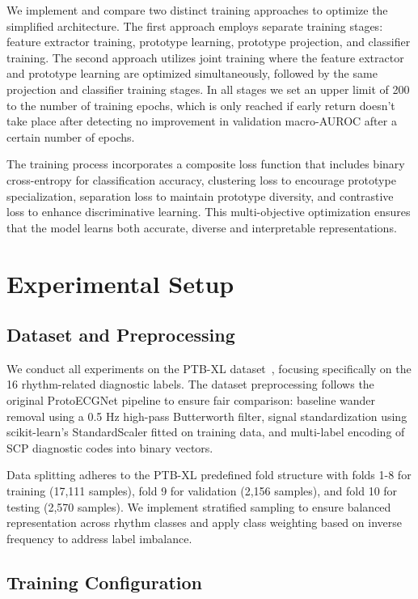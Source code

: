 We implement and compare two distinct training approaches to optimize the simplified architecture. The first approach employs separate training stages: feature extractor training, prototype learning, prototype projection, and classifier training. The second approach utilizes joint training where the feature extractor and prototype learning are optimized simultaneously, followed by the same projection and classifier training stages. In all stages we set an upper limit of 200 to the number of training epochs, which is only reached if early return doesn't take place after detecting no improvement in validation macro-AUROC after a certain number of epochs.

The training process incorporates a composite loss function that includes binary cross-entropy for classification accuracy, clustering loss to encourage prototype specialization, separation loss to maintain prototype diversity, and contrastive loss to enhance discriminative learning. This multi-objective optimization ensures that the model learns both accurate, diverse and interpretable representations.

\section{Experimental Setup}

\subsection{Dataset and Preprocessing}

We conduct all experiments on the PTB-XL dataset~\cite{wagner2020ptbxl}, focusing specifically on the 16 rhythm-related diagnostic labels. The dataset preprocessing follows the original ProtoECGNet pipeline to ensure fair comparison: baseline wander removal using a 0.5 Hz high-pass Butterworth filter, signal standardization using scikit-learn's StandardScaler fitted on training data, and multi-label encoding of SCP diagnostic codes into binary vectors.

Data splitting adheres to the PTB-XL predefined fold structure with folds 1-8 for training (17,111 samples), fold 9 for validation (2,156 samples), and fold 10 for testing (2,570 samples). We implement stratified sampling to ensure balanced representation across rhythm classes and apply class weighting based on inverse frequency to address label imbalance.

\subsection{Training Configuration}

